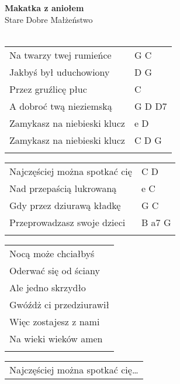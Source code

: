 \documentclass[a5paper]{article}
\begin{document}


\noindent
\fontsize{12pt}{15pt}\selectfont
\textbf{Makatka z aniołem} \\
\fontsize{8pt}{10pt}\selectfont
Stare Dobre Małżeństwo \\ \\
\fontsize{10pt}{12pt}\selectfont
{}
\begin{tabular}{@{}p{7.50cm}p{3cm}@{}}
\noindent
Na twarzy twej rumieńce & G C \\
Jakbyś był uduchowiony & D G \\
Przez gruźlicę płuc & C \\
A dobroć twą nieziemską & G D D7 \\
Zamykasz na niebieski klucz & e D \\
Zamykasz na niebieski klucz & C D G \\ \\
\end{tabular}

\noindent
\begin{tabular}{@{}p{6.50cm}p{3cm}@{}}
Najczęściej można spotkać cię & C D \\
Nad przepaścią lukrowaną & e C \\
Gdy przez dziurawą kładkę & G C \\
Przeprowadzasz swoje dzieci & B a7 G \\ \\
\end{tabular}

\noindent
\begin{tabular}{@{}p{8.50cm}@{}}
Nocą może chciałbyś \\
Oderwać się od ściany \\
Ale jedno skrzydło \\
Gwóźdż ci przedziurawił \\
Więc zostajesz z nami \\
Na wieki wieków amen \\ \\
\end{tabular}

\noindent
\begin{tabular}{@{}p{7.50cm}@{}}
Najczęściej można spotkać cię… 
\end{tabular}
\end{document}
